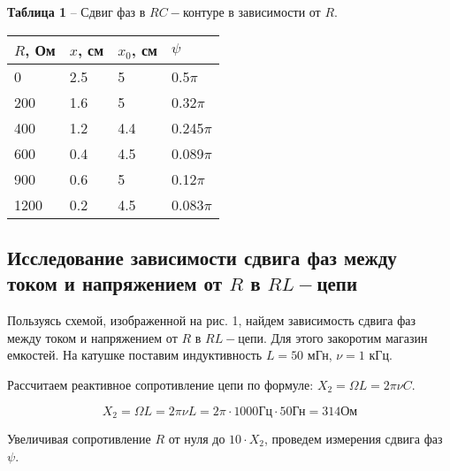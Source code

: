 \documentclass[12pt,a4paper]{article}
\begin{document}
        \begin{table}[!h]
        \begin{flushleft}
       		\hspace{80}\textbf{Таблица 1} -- Сдвиг фаз в $RC-$контуре в зависимости от  $R$.\\
        \end{flushleft}
            \begin{center}
                \begin{tabular}{ | l | l | l | l |}
                    \hline
                    $R$, Ом &   $x$, см &  $x_0$, см &   $\psi$  \\
                    \hline
                    0   &   2.5 &   5   &   0.5$\pi$\\
                    200 &   1.6 &   5   &   0.32$\pi$\\
                    400 &   1.2 &   4.4 &   0.245$\pi$\\
                    600 &   0.4 &   4.5 &   0.089$\pi$\\
                    900 &   0.6 &   5   &   0.12$\pi$\\
                    1200&   0.2 &   4.5 &   0.083$\pi$\\
                    \hline                
                \end{tabular}
            \end{center}
        \end{table}
            
    \subsection{Исследование зависимости сдвига фаз между током и напряжением от $R$ в $RL-$цепи}
        Пользуясь схемой, изображенной на рис. 1, найдем зависимость сдвига фаз между током и напряжением от $R$ в $RL-$цепи. Для этого закоротим магазин емкостей. На катушке поставим индуктивность $L = 50$ мГн, $\nu = 1$ кГц.
        
        Рассчитаем реактивное сопротивление цепи по формуле: $X_2 = \Omega L = 2 \pi \nu C$. 
        
        \[
        X_2 = \Omega L = 2 \pi \nu L = 2 \pi \cdot 1000 \text{Гц}\cdot 50\text{Гн} = 314 \text{Ом}
        \]
        
        Увеличивая сопротивление $R$ от нуля до $10 \cdot X_2$, проведем измерения сдвига фаз $\psi$.
        
\end{document}

